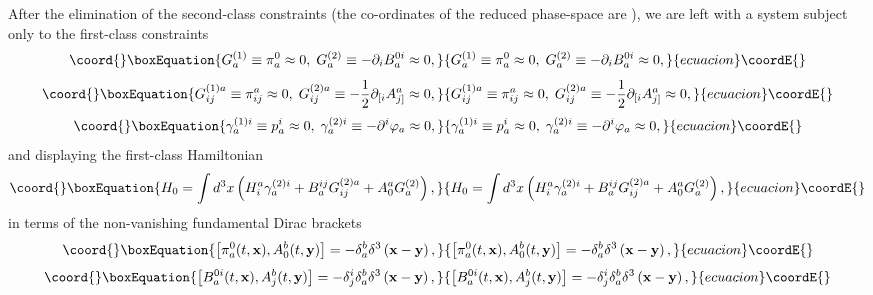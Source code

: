 \documentclass[a4paper,12pt]{article}
\begin{document}
After the elimination of the second-class constraints (the co-ordinates of
the reduced phase-space are \coordHE{}), we are left with a system subject only to the first-class
constraints 
\begin{equation}\coord{}\boxEquation{
G_{a}^{(1)}\equiv \pi _{a}^{0}\approx 0,\;G_{a}^{(2)}\equiv -\partial
_{i}B_{a}^{0i}\approx 0,  \label{xx2}
}{
G_{a}^{(1)}\equiv \pi _{a}^{0}\approx 0,\;G_{a}^{(2)}\equiv -\partial
_{i}B_{a}^{0i}\approx 0,  }{ecuacion}\coordE{}\end{equation}
\begin{equation}\coord{}\boxEquation{
G_{ij}^{(1)a}\equiv \pi _{ij}^{a}\approx 0,\;G_{ij}^{(2)a}\equiv -\frac{1}{2}
\partial _{[i}A_{j]}^{a}\approx 0,  \label{xx3}
}{
G_{ij}^{(1)a}\equiv \pi _{ij}^{a}\approx 0,\;G_{ij}^{(2)a}\equiv -\frac{1}{2}
\partial _{[i}A_{j]}^{a}\approx 0,  }{ecuacion}\coordE{}\end{equation}
\begin{equation}\coord{}\boxEquation{
\gamma _{a}^{(1)i}\equiv p_{a}^{i}\approx 0,\;\gamma _{a}^{(2)i}\equiv
-\partial ^{i}\varphi _{a}\approx 0,  \label{xx4}
}{
\gamma _{a}^{(1)i}\equiv p_{a}^{i}\approx 0,\;\gamma _{a}^{(2)i}\equiv
-\partial ^{i}\varphi _{a}\approx 0,  }{ecuacion}\coordE{}\end{equation}
and displaying the first-class Hamiltonian 
\begin{equation}\coord{}\boxEquation{
H_{0}=\int d^{3}x\left( H_{i}^{a}\gamma
_{a}^{(2)i}+B_{a}^{ij}G_{ij}^{(2)a}+A_{0}^{a}G_{a}^{(2)}\right) ,
\label{xx5}
}{
H_{0}=\int d^{3}x\left( H_{i}^{a}\gamma
_{a}^{(2)i}+B_{a}^{ij}G_{ij}^{(2)a}+A_{0}^{a}G_{a}^{(2)}\right) ,
}{ecuacion}\coordE{}\end{equation}
in terms of the non-vanishing fundamental Dirac brackets 
\begin{equation}\coord{}\boxEquation{
\left[ \pi _{a}^{0}(t,\mathbf{x}),A_{0}^{b}(t,\mathbf{y})\right] =-\delta
_{a}^{b}\delta ^{3}\left( \mathbf{x}-\mathbf{y}\right) ,  \label{xx6}
}{
\left[ \pi _{a}^{0}(t,\mathbf{x}),A_{0}^{b}(t,\mathbf{y})\right] =-\delta
_{a}^{b}\delta ^{3}\left( \mathbf{x}-\mathbf{y}\right) ,  }{ecuacion}\coordE{}\end{equation}
\begin{equation}\coord{}\boxEquation{
\left[ B_{a}^{0i}(t,\mathbf{x}),A_{j}^{b}(t,\mathbf{y})\right] =-\delta
_{j}^{i}\delta _{a}^{b}\delta ^{3}\left( \mathbf{x}-\mathbf{y}\right) ,
\label{xx7}
}{
\left[ B_{a}^{0i}(t,\mathbf{x}),A_{j}^{b}(t,\mathbf{y})\right] =-\delta
_{j}^{i}\delta _{a}^{b}\delta ^{3}\left( \mathbf{x}-\mathbf{y}\right) ,
}{ecuacion}\coordE{}\end{equation}
\end{document}
